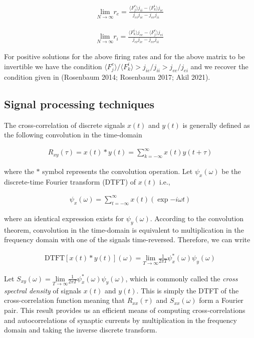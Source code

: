\documentclass{ucetd}
\begin{document}
\begin{align}
\underset{N\rightarrow \infty}{\mathrm{lim}}r_{e} = \frac{\langle F_{j}^{e}\rangle j_{ii}-\langle F_{k}^{i}\rangle j_{ie}}{j_{ei}j_{ie} - j_{ee}j_{ii}}
\end{align}

\begin{align}
\underset{N\rightarrow \infty}{\mathrm{lim}}r_{i} = \frac{\langle F_{k}^{i}\rangle j_{ee}-\langle F_{j}^{e}\rangle j_{ei}}{j_{ei}j_{ie} - j_{ee}j_{ii}}
\end{align}

For positive solutions for the above firing rates and for the above matrix to be invertible we have the condition $\langle F_{j}^{e}\rangle/\langle F_{k}^{i}\rangle > j_{ie}/j_{ii} > j_{ee}/j_{ei}$ and we recover the condition given in (Rosenbaum 2014; Rosenbaum 2017; Akil 2021).

\subsection{Signal processing techniques}

The cross-correlation of discrete signals $x(t)$ and $y(t)$ is generally defined as the following convolution in the time-domain

\begin{align}
R_{xy}(\tau) = x(t) * y(t) = \sum_{k =-\infty}^{\infty}x(t)y(t+\tau)
\end{align}

where the $*$ symbol represents the convolution operation. Let $\psi_{x}(\omega)$ be the discrete-time Fourier transform (DTFT) of $x(t)$ i.e.,

\begin{align}
\psi_{x}(\omega) = \sum_{t =-\infty}^{\infty}x(t)\left(\exp{-i\omega t}\right)
\end{align}

where an identical expression exists for $\psi_{y}(\omega)$. According to the convolution theorem, convolution in the time-domain is equivalent to multiplication in the frequency domain with one of the signals time-reversed. Therefore, we can write

\begin{align}
\mathrm{DTFT}[x(t) * y(t)](\omega) = \underset{T\rightarrow\infty}{\mathrm{lim}}\frac{1}{2\pi T}\psi_{x}^{*}(\omega)\psi_{y}(\omega)
\end{align}


Let $S_{xy}(\omega) = \underset{T\rightarrow\infty}{\mathrm{lim}}\frac{1}{2\pi T}\psi_{x}^{*}(\omega)\psi_{y}(\omega)$, which is commonly called the \emph{cross spectral density} of signals $x(t)$ and $y(t)$. This is simply the DTFT of the cross-correlation function meaning that $R_{xx}(\tau)$ and $S_{xx}(\omega)$ form a Fourier pair. This result provides us an efficient means of computing cross-correlations and autocorrelations of synaptic currents by multiplication in the frequency domain and taking the inverse discrete transform.
\end{document}
